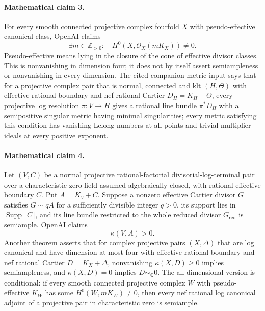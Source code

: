 \documentclass[11pt]{article}
\begin{document}
\paragraph{Mathematical claim 3.} For every smooth connected projective complex fourfold $X$ with pseudo-effective canonical class, OpenAI claims
\[
\exists m\in\mathbb Z_{>0}:\quad H^0(X,\mathcal O_X(mK_X))\ne0.
\]
Pseudo-effective means lying in the closure of the cone of effective divisor classes. This is nonvanishing in dimension four; it does not by itself assert semiampleness or nonvanishing in every dimension.
The cited companion metric input says that for a projective complex pair that is normal, connected and klt $(H,\Theta)$ with effective rational boundary and nef rational Cartier $D_H=K_H+\Theta$, every projective log resolution $\pi:V\to H$ gives a rational line bundle $\pi^*D_H$ with a semipositive singular metric having minimal singularities; every metric satisfying this condition has vanishing Lelong numbers at all points and trivial multiplier ideals at every positive exponent.

\paragraph{Mathematical claim 4.} Let $(V,C)$ be a normal projective rational-factorial divisorial-log-terminal pair over a characteristic-zero field assumed algebraically closed, with rational effective boundary $C$. Put $A=K_V+C$. Suppose a nonzero effective Cartier divisor $G$ satisfies $G\sim qA$ for a sufficiently divisible integer $q>0$, its support lies in $\operatorname{Supp}\lfloor C\rfloor$, and its line bundle restricted to the whole reduced divisor $G_{\mathrm{red}}$ is semiample. OpenAI claims
\[
\kappa(V,A)>0.
\]
Another theorem asserts that for complex projective pairs $(X,\Delta)$ that are log canonical and have dimension at most four with effective rational boundary and nef rational Cartier $D=K_X+\Delta$, nonvanishing $\kappa(X,D)\ge0$ implies semiampleness, and $\kappa(X,D)=0$ implies $D\sim_{\mathbb Q}0$.
The all-dimensional version is conditional: if every smooth connected projective complex $W$ with pseudo-effective $K_W$ has some $H^0(W,mK_W)\ne0$, then every nef rational log canonical adjoint of a projective pair in characteristic zero is semiample.
\end{document}
